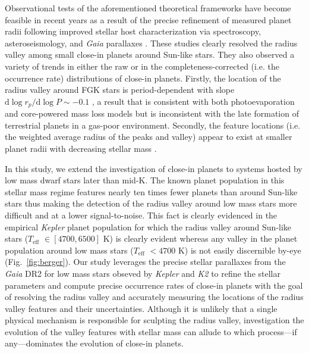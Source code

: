 \documentclass[modern]{aastex63}
\newcommand\gaia{\emph{Gaia}}
\newcommand\kepler{\emph{Kepler}}
\newcommand\ktwo{\emph{K2}}
\newcommand\teff{$T_{\text{eff}}$}
\begin{document}
Observational tests of the aforementioned theoretical frameworks have become feasible in recent years as a result 
of the precise refinement of measured planet radii following improved stellar host characterization via  
spectroscopy, asteroseismology, and \gaia{} parallaxes
\citep[e.g.][]{fulton17,vaneylen18,fulton18,martinez19}. These studies clearly resolved the radius valley 
among small close-in planets around Sun-like stars. They also observed a variety of trends in either
the raw or in the completeness-corrected (i.e. the occurrence rate) distributions of close-in planets. Firstly,
the location of the radius valley around FGK stars is period-dependent with slope
$\mathrm{d}\log{r_p} / \mathrm{d}\log{P} \sim -0.1$ \citep{vaneylen18,martinez19}, a result that is consistent
with both photoevaporation and core-powered mass loss models but is inconsistent with the late formation of
terrestrial planets in a gas-poor environment. Secondly, the feature locations (i.e. the weighted
average radius of the peaks and valley) appear to exist at smaller planet radii with decreasing stellar
mass \citep{fulton18,wu19}.

In this study, we extend the investigation of close-in planets to systems hosted by
low mass dwarf stars later than mid-K. The known planet population in this stellar mass regime features
nearly ten times fewer planets than around Sun-like stars thus making the detection of the radius
valley around low mass stars more difficult and at a lower signal-to-noise. This fact is clearly evidenced in
the empirical \kepler{} planet population for which the radius valley around Sun-like stars (\teff{}
$\in [4700,6500]$ K) is clearly evident whereas any valley in the planet population around low mass stars
(\teff{} $< 4700$ K) is not easily discernible by-eye (Fig.~\ref{fig:berger}).
Our study leverages the precise stellar parallaxes from the \gaia{} DR2 \citep{lindegren18}
for low mass stars obseved by \kepler{} and \ktwo{} to refine the stellar parameters and compute precise
occurrence rates of close-in planets with the goal of resolving the radius valley and accurately measuring the
locations of the radius valley features and their uncertainties. Although it is unlikely that a single physical
mechanism is responsible for sculpting the radius valley, investigation the evolution of the valley features with
stellar mass can allude to which process---if any---dominates the evolution of close-in planets.
\end{document}
